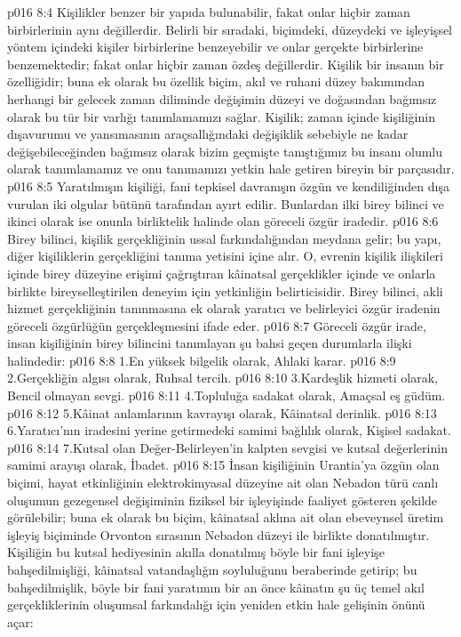 \vs p016 8:4 Kişilikler benzer bir yapıda bulunabilir, fakat onlar hiçbir zaman birbirlerinin aynı değillerdir. Belirli bir sıradaki, biçimdeki, düzeydeki ve işleyişsel yöntem içindeki kişiler birbirlerine benzeyebilir ve onlar gerçekte birbirlerine benzemektedir; fakat onlar hiçbir zaman özdeş değillerdir. Kişilik bir insanın  bir özelliğidir; buna ek olarak bu özellik biçim, akıl ve ruhani düzey bakımından herhangi bir gelecek zaman diliminde değişimin düzeyi ve doğasından bağımsız olarak bu tür bir varlığı tanımlamamızı sağlar. Kişilik; zaman içinde kişiliğinin dışavurumu ve yansımasının araçsallığındaki değişiklik sebebiyle ne kadar değişebileceğinden bağımsız olarak bizim geçmişte tanıştığımız bu insanı olumlu olarak tanımlamamız ve onu tanımamızı yetkin hale getiren bireyin bir parçasıdır.
\vs p016 8:5 Yaratılmışın kişiliği, fani tepkisel davranışın özgün ve kendiliğinden dışa vurulan iki olgular bütünü tarafından ayırt edilir. Bunlardan ilki birey bilinci ve ikinci olarak ise onunla birliktelik halinde olan göreceli özgür iradedir.
\vs p016 8:6 Birey bilinci, kişilik gerçekliğinin ussal farkındalığından meydana gelir; bu yapı, diğer kişiliklerin gerçekliğini tanıma yetisini içine alır. O, evrenin kişilik ilişkileri içinde birey düzeyine erişimi çağrıştıran kâinatsal gerçeklikler içinde ve onlarla birlikte bireyselleştirilen deneyim için yetkinliğin belirticisidir. Birey bilinci, akli hizmet gerçekliğinin tanınmasına ek olarak yaratıcı ve belirleyici özgür iradenin göreceli özgürlüğün gerçekleşmesini ifade eder.
\vs p016 8:7 Göreceli özgür irade, insan kişiliğinin birey bilincini tanımlayan şu bahsi geçen durumlarla ilişki halindedir:
\vs p016 8:8 1.\bibnobreakspace En yüksek bilgelik olarak, Ahlaki karar.
\vs p016 8:9 2.\bibnobreakspace Gerçekliğin algısı olarak, Ruhsal tercih.
\vs p016 8:10 3.\bibnobreakspace Kardeşlik hizmeti olarak, Bencil olmayan sevgi.
\vs p016 8:11 4.\bibnobreakspace Topluluğa sadakat olarak, Amaçsal eş güdüm.
\vs p016 8:12 5.\bibnobreakspace Kâinat anlamlarının kavrayışı olarak, Kâinatsal derinlik.
\vs p016 8:13 6.\bibnobreakspace Yaratıcı’nın iradesini yerine getirmedeki samimi bağlılık olarak, Kişisel sadakat.
\vs p016 8:14 7.\bibnobreakspace Kutsal olan Değer\hyp{}Belirleyen’in kalpten sevgisi ve kutsal değerlerinin samimi arayışı olarak, İbadet.
\vs p016 8:15 İnsan kişiliğinin Urantia’ya özgün olan biçimi, hayat etkinliğinin elektrokimyasal düzeyine ait olan Nebadon türü canlı oluşumun gezegensel değişiminin fiziksel bir işleyişinde faaliyet gösteren şekilde görülebilir; buna ek olarak bu biçim, kâinatsal aklına ait olan ebeveynsel üretim işleyiş biçiminde Orvonton sırasının Nebadon düzeyi ile birlikte donatılmıştır. Kişiliğin bu kutsal hediyesinin akılla donatılmış böyle bir fani işleyişe bahşedilmişliği, kâinatsal vatandaşlığın soyluluğunu beraberinde getirip; bu bahşedilmişlik, böyle bir fani yaratımın bir an önce kâinatın şu üç temel akıl gerçekliklerinin oluşumsal farkındalığı için yeniden etkin hale gelişinin önünü açar:
